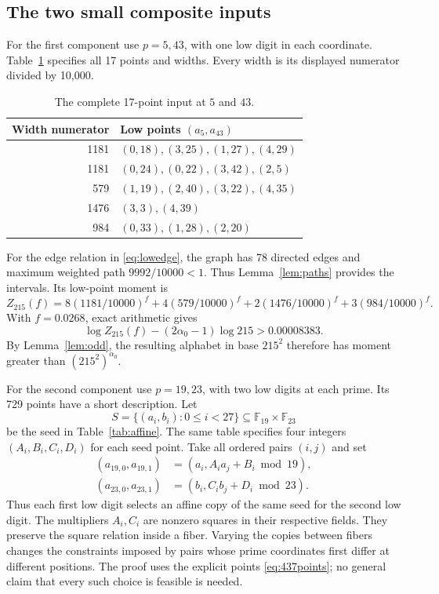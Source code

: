 \documentclass[11pt]{article}
\theoremstyle{definition}
\theoremstyle{remark}
\newcommand{\al}{\alpha_0}
\begin{document}
\subsection{The two small composite inputs}
For the first component use $p=5,43$, with one low digit in each
coordinate. Table~\ref{tab:215} specifies all 17 points and widths.
Every width is its displayed numerator divided by 10,000.
\begin{table}[ht]
\centering
\begin{tabular}{rl}\toprule
Width numerator&Low points $(a_5,a_{43})$\\\midrule
1181&$(0,18),(3,25),(1,27),(4,29)$\\
1181&$(0,24),(0,22),(3,42),(2,5)$\\
579&$(1,19),(2,40),(3,22),(4,35)$\\
1476&$(3,3),(4,39)$\\
984&$(0,33),(1,28),(2,20)$\\\bottomrule
\end{tabular}
\caption{The complete 17-point input at $5$ and $43$.}\label{tab:215}
\end{table}
For the edge relation in \eqref{eq:lowedge}, the graph has 78 directed
edges and maximum weighted path $9992/10000<1$. Thus Lemma~\ref{lem:paths}
provides the intervals. Its low-point moment is
\[
 Z_{215}(f)=8(1181/10000)^f+4(579/10000)^f
       +2(1476/10000)^f+3(984/10000)^f.
\]
With $f=0.0268$, exact arithmetic gives
\begin{equation}\label{eq:215moment}
 \log Z_{215}(f)-(2\al-1)\log215>0.00008383.
\end{equation}
By Lemma~\ref{lem:odd}, the resulting alphabet in base $215^2$ therefore
has moment greater than $(215^2)^{\al}$.

For the second component use $p=19,23$, with two low digits at each
prime. Its 729 points have a short description. Let
\[
 S=\{(a_i,b_i):0\le i<27\}\subseteq\mathbb F_{19}\times\mathbb F_{23}
\]
be the seed in Table~\ref{tab:affine}. The same table specifies four
integers $(A_i,B_i,C_i,D_i)$ for each seed point. Take all ordered pairs
$(i,j)$ and set
\begin{equation}\label{eq:437points}
 \begin{split}
 (a_{19,0},a_{19,1})&=(a_i,A_i a_j+B_i\bmod19),\\
 (a_{23,0},a_{23,1})&=(b_i,C_i b_j+D_i\bmod23).
 \end{split}
\end{equation}
Thus each first low digit selects an affine copy of the same seed for
the second low digit. The multipliers $A_i,C_i$ are nonzero squares in
their respective fields. They preserve the square relation inside a
fiber. Varying the copies between fibers changes the constraints imposed
by pairs whose prime coordinates first differ at different positions.
The proof uses the explicit points \eqref{eq:437points}; no general
claim that every such choice is feasible is needed.
\end{document}
